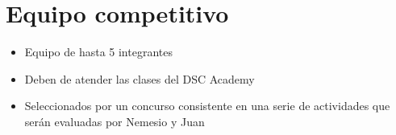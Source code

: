 \documentclass{article}
\begin{document}
    \section{Equipo competitivo}
        
        \begin{itemize}
            \item Equipo de hasta 5 integrantes
            \item Deben de atender las clases del DSC Academy
            \item Seleccionados por un concurso consistente en una serie de actividades que serán evaluadas por Nemesio y Juan
        \end{itemize}
\end{document}
